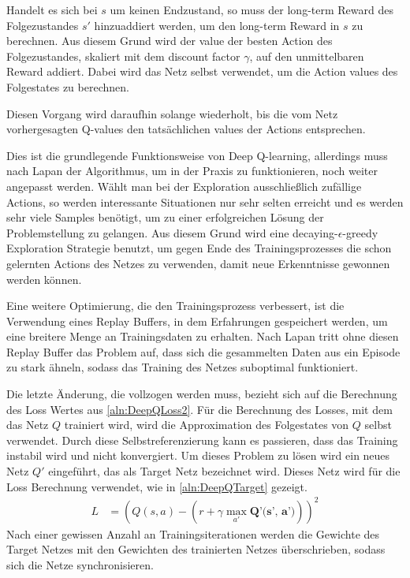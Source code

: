 \documentclass[11pt]{scrartcl}
\begin{document}
Handelt es sich bei $s$ um keinen Endzustand, so muss der long-term Reward des
Folgezustandes $s'$ hinzuaddiert werden, um den long-term Reward in $s$ zu berechnen. Aus
diesem Grund wird der value der besten Action des Folgezustandes, skaliert mit dem 
discount factor $\gamma$, auf den unmittelbaren Reward addiert. Dabei wird das Netz selbst
verwendet, um die Action values des Folgestates zu berechnen.

Diesen Vorgang wird daraufhin solange wiederholt, bis die vom Netz vorhergesagten Q-values
den tat\-säch\-lich\-en values der Actions entsprechen.

Dies ist die grundlegende Funktionsweise von Deep Q-learning, allerdings muss nach Lapan
\cite[~S.202]{L2018} der Algorithmus, um in der Praxis zu funktionieren, noch weiter
angepasst werden. Wählt man bei der Exploration ausschließlich zufällige Actions, so
werden interessante Situationen nur sehr selten erreicht und es werden sehr viele Samples
benötigt, um zu einer erfolgreichen Lösung der Problemstellung zu gelangen. Aus diesem
Grund wird eine decaying-$\epsilon$-greedy Exploration Strategie benutzt, um gegen Ende
des Trainingsprozesses die schon gelernten Actions des Netzes zu verwenden, damit neue
Erkenntnisse gewonnen werden können.

Eine weitere Optimierung, die den Trainingsprozess verbessert, ist die Verwendung eines
Replay Buffers, in dem Erfahrungen gespeichert werden, um eine breitere Menge an
Trainingsdaten zu erhalten. Nach Lapan \cite{L2018} tritt ohne diesen Replay Buffer das %
Problem auf, dass sich die gesammelten Daten aus ein Episode zu stark ähneln, sodass das
Training des Netzes suboptimal funktioniert.

Die letzte Änderung, die vollzogen werden muss, bezieht sich auf die Berechnung des Loss
Wertes aus \autoref{aln:DeepQLoss2}. Für die Berechnung des Losses, mit dem das Netz $Q$
trainiert wird, wird die Approximation des Folgestates von $Q$ selbst verwendet. Durch
diese Selbstreferenzierung kann es passieren, dass das Training instabil wird und nicht
konvergiert. Um dieses Problem zu lösen wird ein neues Netz $Q'$ eingeführt, das als
Target Netz bezeichnet wird. Dieses Netz wird für die Loss Berechnung verwendet, wie in
\autoref{aln:DeepQTarget} gezeigt.
\begin{align}
  L & = \left(Q(s, a) - \left(r + \gamma \max_{a'} \textbf{Q'(s', a')}\right)\right)^2
  \label{aln:DeepQTarget}
\end{align}
\noindent
Nach einer gewissen Anzahl an Trainingsiterationen werden die Gewichte des Target Netzes
mit den Gewichten des trainierten Netzes überschrieben, sodass sich die Netze
synchronisieren.
\end{document}
